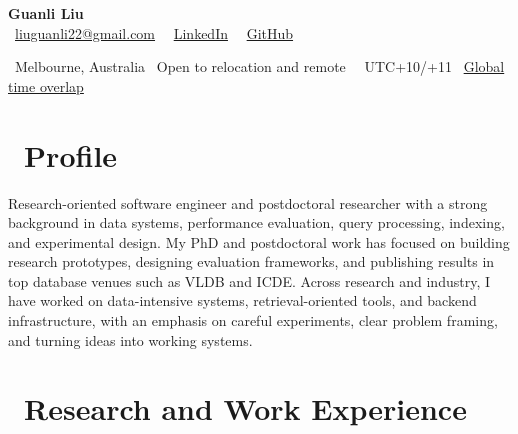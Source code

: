 \documentclass{resume}
\begin{document}

{\LARGE \textbf{Guanli Liu}}\\[-0.2em]
\faEnvelope\ \href{mailto:liuguanli22@gmail.com}{liuguanli22@gmail.com} 
\textperiodcentered\ 
\faLinkedin\ \href{https://www.linkedin.com/in/guanli-liu-11353058/}{LinkedIn} \textperiodcentered\ 
\faGithub\ \href{https://github.com/Liuguanli}{GitHub}

\faMapMarker\ Melbourne, Australia \textperiodcentered\ Open to relocation and remote \textperiodcentered\ 
\faClockO\  UTC+10/+11 \textperiodcentered\ 
\href{https://www.worldtimebuddy.com/?lid=5808079,5128581,5809844,1816670,2158177&h=2158177&hf=1}{Global time overlap \faExternalLink}
\vspace{0.4em}



\section{\faUser\ \textbf{Profile}}
Research-oriented software engineer and postdoctoral researcher with a strong background in data systems, performance evaluation, query processing, indexing, and experimental design. My PhD and postdoctoral work has focused on building research prototypes, designing evaluation frameworks, and publishing results in top database venues such as VLDB and ICDE. Across research and industry, I have worked on data-intensive systems, retrieval-oriented tools, and backend infrastructure, with an emphasis on careful experiments, clear problem framing, and turning ideas into working systems.



\section{\faUsers\ \textbf{Research and Work Experience}}

\end{document}
